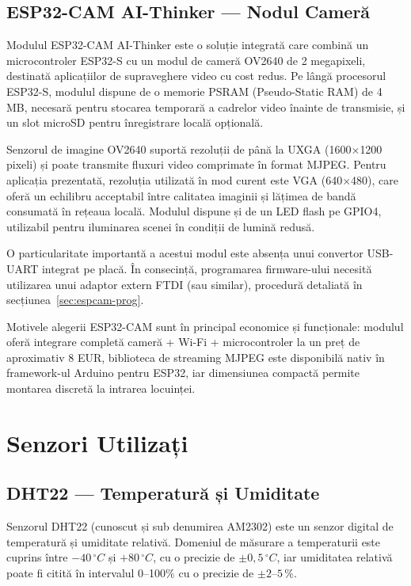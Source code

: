 \documentclass[12pt, twoside, a4paper]{report}
\begin{document}
\subsection{ESP32-CAM AI-Thinker --- Nodul Cameră}

Modulul ESP32-CAM AI-Thinker este o soluție integrată care combină un microcontroler
ESP32-S cu un modul de cameră OV2640 de 2 megapixeli, destinată aplicațiilor de
supraveghere video cu cost redus. Pe lângă procesorul ESP32-S, modulul dispune de o
memorie PSRAM (Pseudo-Static RAM) de 4 MB, necesară pentru stocarea temporară a
cadrelor video înainte de transmisie, și un slot microSD pentru înregistrare locală
opțională.

Senzorul de imagine OV2640 suportă rezoluții de până la UXGA (1600$\times$1200 pixeli)
și poate transmite fluxuri video comprimate în format MJPEG. Pentru aplicația prezentată,
rezoluția utilizată în mod curent este VGA (640$\times$480), care oferă un echilibru
acceptabil între calitatea imaginii și lățimea de bandă consumată în rețeaua locală.
Modulul dispune și de un LED flash pe GPIO4, utilizabil pentru iluminarea scenei în
condiții de lumină redusă.

O particularitate importantă a acestui modul este absența unui convertor USB-UART
integrat pe placă. În consecință, programarea firmware-ului necesită utilizarea unui
adaptor extern FTDI (sau similar), procedură detaliată în secțiunea~\ref{sec:espcam-prog}.

Motivele alegerii ESP32-CAM sunt în principal economice și funcționale: modulul oferă
integrare completă cameră + Wi-Fi + microcontroler la un preț de aproximativ 8 EUR,
biblioteca de streaming MJPEG este disponibilă nativ în framework-ul Arduino pentru
ESP32, iar dimensiunea compactă permite montarea discretă la intrarea locuinței.

\section{Senzori Utilizați}

\subsection{DHT22 --- Temperatură și Umiditate}

Senzorul DHT22 (cunoscut și sub denumirea AM2302) este un senzor digital de temperatură
și umiditate relativă. Domeniul de măsurare a temperaturii este cuprins între
$-40\,^{\circ}C$ și $+80\,^{\circ}C$, cu o precizie de $\pm 0{,}5\,^{\circ}C$, iar
umiditatea relativă poate fi citită în intervalul 0--100\% cu o precizie de
$\pm 2$--$5\,\%$.
\end{document}
